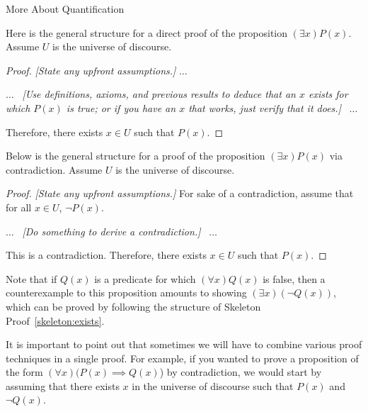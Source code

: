 \begin{section}{More About Quantification}
\begin{skeleton}\label{skeleton:exists}
Here is the general structure for a direct proof of the proposition $(\exists x)P(x)$. Assume $U$ is the universe of discourse.

\begin{mdframed}[style=skeleton]
\begin{proof}
\emph{[State any upfront assumptions.]} $\ldots$ 
\begin{center}
$\ldots$ \ \emph{[Use definitions, axioms, and previous results to deduce that an $x$ exists for which $P(x)$ is true; or if you have an $x$ that works, just verify that it does.]} \ $\ldots$ 
\end{center}
\noindent Therefore, there exists $x\in U$ such that $P(x)$.
\end{proof}
\end{mdframed}
\end{skeleton}

\begin{skeleton}
Below is the general structure for a proof of the proposition $(\exists x)P(x)$ via contradiction. Assume $U$ is the universe of discourse.

\begin{mdframed}[style=skeleton]
\begin{proof}
\emph{[State any upfront assumptions.]} For sake of a contradiction, assume that for all $x\in U$, $\neg P(x)$.
\begin{center}
$\ldots$ \ \emph{[Do something to derive a contradiction.]} \ $\ldots$\\
\end{center}
\noindent This is a contradiction. Therefore, there exists $x\in U$ such that $P(x)$.
\end{proof}
\end{mdframed}
\end{skeleton}

Note that if $Q(x)$ is a predicate for which $(\forall x)Q(x)$ is false, then a counterexample to this proposition amounts to showing $(\exists x)(\neg Q(x))$, which can be proved by following the structure of Skeleton Proof~\ref{skeleton:exists}.

It is important to point out that sometimes we will have to combine various proof techniques in a single proof.  For example, if you wanted to prove a proposition of the form $(\forall x)(P(x) \implies Q(x)$) by contradiction, we would start by assuming that there exists $x$ in the universe of discourse such that $P(x)$ and $\neg Q(x)$.


\end{section}
